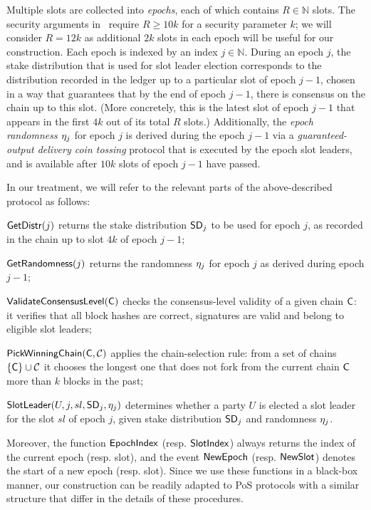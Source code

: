 Multiple slots are collected into \textit{epochs}, each of which contains
$R\in \mathbb{N}$ slots. The security arguments in~\cite{C:KRDO17} require $R\geq 10k$
for a security parameter $k$; we will consider $R=12k$ as additional $2k$ slots
in each epoch will be useful for our construction.
Each epoch is indexed by an index $j \in \mathbb{N}$. During an epoch
$j$, the stake distribution that is used for slot leader election corresponds to
the distribution recorded in the ledger up to
a particular slot of epoch $j-1$, chosen in a way that guarantees that by the
end of epoch $j-1$, there is consensus on the chain up to this slot. (More
concretely, this is the latest slot of epoch $j-1$ that appears in the first $4k$
out of its total $R$ slots.)
Additionally, the \emph{epoch randomness $\eta_j$} for epoch $j$ is derived
during the epoch $j-1$ via a \emph{guaranteed-output delivery coin tossing}
protocol
that is executed by the epoch slot leaders,
and is available after $10k$ slots of epoch $j-1$ have passed.

In our treatment, we will refer to the relevant parts of the above-described protocol as
follows:
\begin{description}
\item
  $\mathsf{GetDistr}(j)$
  returns the stake distribution $\mathsf{SD}_j$ to be used for epoch $j$, as recorded in the
    chain up to slot $4k$ of epoch $j-1$;

\item
  $\mathsf{GetRandomness}(j)$
  returns the randomness $\eta_j$ for epoch $j$ as derived during epoch $j-1$;
\item
  $\mathsf{ValidateConsensusLevel}(\mathsf{C})$
  checks the consensus-level validity of a given chain $\mathsf{C}$: it verifies that all block hashes
    are correct, signatures are valid and belong to eligible slot leaders;
\item
  $\mathsf{PickWinningChain}(\mathsf{C},\mathcal{C})$
    applies the chain-selection rule: from a set of chains $\{\mathsf{C}\}\cup\mathcal{C}$ it
    chooses the longest one that does not fork from the current chain $\mathsf{C}$
    more than $k$ blocks in the past;
\item
  $\mathsf{SlotLeader}(U,j,sl,\mathsf{SD}_j,\eta_{j})$
  determines whether a party $U$ is elected a slot leader for the slot $sl$ of
    epoch $j$, given stake distribution $\mathsf{SD}_j$ and randomness $\eta_{j}$.
\end{description}
Moreover, the function $\mathsf{EpochIndex}$ (resp. $\mathsf{SlotIndex}$) always returns
the index of the current epoch (resp. slot), and the event $\mathsf{NewEpoch}$ (resp.
$\mathsf{NewSlot}$) denotes the start of a new epoch (resp. slot).
Since we use these functions in a black-box manner, our construction can be
readily adapted to PoS protocols with a similar structure that differ in the
details of these procedures.


